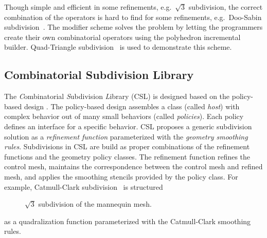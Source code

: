 Though simple and efficient in some
refinements, e.g.\ $\sqrt{3}$ subdivision, the correct combination of
the operators is hard to find for some refinements, e.g.\ Doo-Sabin
subdivision~\cite{ds}. The modifier scheme solves the problem by
letting the programmers create their own combinatorial operators 
using the polyhedron incremental builder. Quad-Triangle
subdivision~\cite{qts,l-pg-03} is used to demonstrate this scheme.

\subsection*{Combinatorial Subdivision Library}

The \emph{C}ombinatorial \emph{S}ubdivision \emph{L}ibrary 
(CSL) is designed based on the policy-based design 
\cite{Alexandrescu:2001:MCD}.
The policy-based design assembles a class
(called \emph{host}) with complex behavior out of many 
small behaviors (called \emph{policies}).
Each policy defines an interface for a
specific behavior. CSL proposes a 
generic subdivision solution as a \emph{refinement function}
parameterized with the \emph{geometry smoothing rules}.
Subdivisions in CSL are build as proper combinations of the
refinement functions and the geometry policy classes.
The refinement function refines the control mesh,
maintains the correspondence between the control mesh and refined
mesh, and applies the smoothing stencils provided by the policy
class. For example, Catmull-Clark subdivision~\cite{cc} is structured
\begin{figure}[h]
    \caption{$\sqrt{3}$ subdivision of the mannequin mesh.}
    \label{fig:sqrt3}
    \vspace{0.5cm}
\end{figure}
as a quadralization function parameterized with the Catmull-Clark
smoothing rules.


